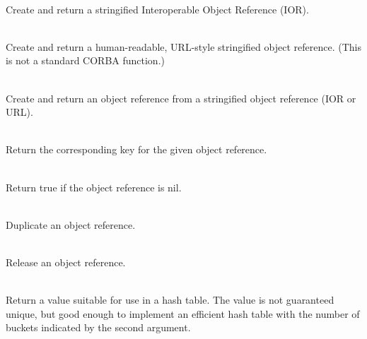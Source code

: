 {\footnotesize
\begin{list}{}{}
  \item%
    {}%
    \hspace{0pt}\\
  Create and return a stringified Interoperable Object Reference (IOR).

  \item%
    {}%
    \hspace{0pt}\\
  Create and return a human-readable, URL-style stringified object reference.
  (This is not a standard CORBA function.)

  \item%
    {}%
    \hspace{0pt}\\
  Create and return an object reference from a stringified object reference
  (IOR or URL).

  \item%
    {}%
    \hspace{0pt}\\
  Return the corresponding key for the given object reference.

  \item%
    {}%
    \hspace{0pt}\\
  Return true if the object reference is nil.

  \item%
    {}%
    \hspace{0pt}\\
  Duplicate an object reference.

  \item%
    {}%
    \hspace{0pt}\\
  Release an object reference.

  \item%
    {}%
    \hspace{0pt}\\
  Return a value suitable for use in a hash table.  The value is not guaranteed
  unique, but good enough to implement an efficient hash table with the number
  of buckets indicated by the second argument.


\end{list}}
